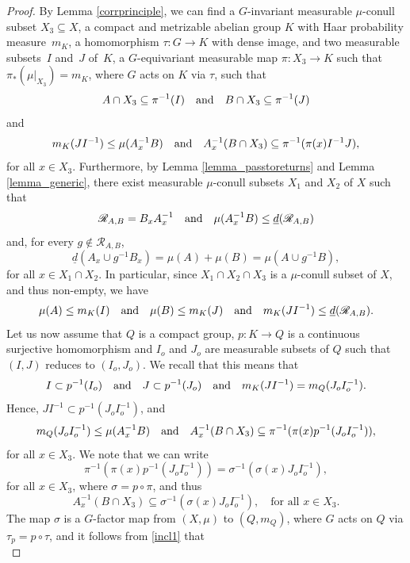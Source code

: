 \documentclass[10pt]{amsart}
\let\mathcal\mathscr
\newcommand{\cR}{\mathcal{R}}
\newcommand{\qand}{\quad\textup{and}\quad}
\theoremstyle{plain}
\theoremstyle{definition}
\begin{document}
\begin{proof}
By Lemma \ref{corrprinciple}, we can find a $G$-invariant measurable $\mu$-conull subset \hbox{$X_3 \subseteq X$}, a compact and
metrizable abelian group $K$ with Haar probability measure~$m_K$, a homomorphism $\tau : G \to K$ with dense image,
and two measurable subsets~$I$ and~$J$ of~$K$, a $G$-equivariant measurable map $\pi : X_3 \to K$ such that
$\pi_*(\mu |_{X_3}) = m_K$, where $G$ acts on $K$ via $\tau$, such that
\begin{equation}
\label{incl1}
A \cap X_3 \subseteq \pi^{-1}(I) \qand B \cap X_3 \subseteq \pi^{-1}(J)
\end{equation}
and
\[
m_K(JI^{-1}) \leq \mu(A_x^{-1}B)
\qand
A_x^{-1}(B \cap X_3) \subseteq \pi^{-1}(\pi(x) I^{-1}J),
\]
for all $x \in X_3$. Furthermore, by Lemma \ref{lemma_passtoreturns} and Lemma \ref{lemma_generic}, there exist measurable
$\mu$-conull subsets $X_1$ and $X_2$ of $X$
such that
\[
\cR_{A,B} = B_x A_x^{-1} \qand \mu(A_x^{-1}B) \leq \underline{d}(\cR_{A,B})
\]
and, for every $g \notin \cR_{A,B}$,
\begin{equation}
\label{recall_overshoot}
\underline{d}(A_x \cup g^{-1}B_x) = \mu(A) + \mu(B) = \mu(A \cup g^{-1}B),
\end{equation}
for all $x \in X_1 \cap X_2$. In particular, since $X_1 \cap X_2 \cap X_3$ is a $\mu$-conull subset of $X$, and thus non-empty, we have
\[
\mu(A) \leq m_K(I) \qand \mu(B) \leq m_K(J) \qand m_K(JI^{-1}) \leq \underline{d}(\cR_{A,B}).
\]
Let us now assume that $Q$ is a compact group, $p : K \to Q$ is a continuous surjective homomorphism and $I_o$ and $J_o$ are
measurable subsets of $Q$ such that $(I,J)$ reduces to $(I_o,J_o)$. We recall that this means that
\[
I \subset p^{-1}(I_o) \qand J \subset p^{-1}(J_o) \qand m_K(JI^{-1}) = m_Q(J_o I_o^{-1}).
\]
Hence, $J I^{-1} \subset p^{-1}(J_o I_o^{-1})$, and
\[
m_Q(J_oI_o^{-1}) \leq \mu(A_x^{-1}B)
\qand
A_x^{-1}(B \cap X_3) \subseteq \pi^{-1}(\pi(x) p^{-1}(J_o I_o^{-1})),
\]
for all $x \in X_3$.
We note that we can write
\[
\pi^{-1}(\pi(x) p^{-1}(J_o I_o^{-1})) = \sigma^{-1}(\sigma(x) J_o I_o^{-1}),
\]
for all $x \in X_3$, where $\sigma = p \circ \pi$, and thus
\begin{equation}
A_x^{-1}(B \cap X_3) \subseteq \sigma^{-1}(\sigma(x) J_o I_o^{-1}), \quad \textrm{for all $x \in X_3$}.
\end{equation}
The map $\sigma$ is a $G$-factor map from $(X,\mu)$ to $(Q,m_Q)$, where $G$ acts on
$Q$ via $\tau_p = p \circ \tau$, and it follows from \eqref{incl1} that
\begin{equation}

\end{equation}
\end{proof}
\end{document}
